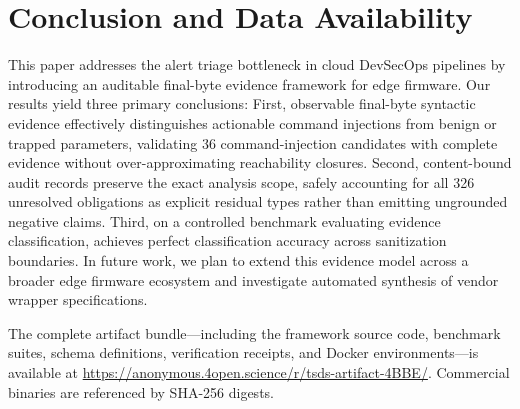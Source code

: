 \section{Conclusion and Data Availability}
\label{sec:conclusion}

This paper addresses the alert triage bottleneck in cloud DevSecOps pipelines by introducing an auditable final-byte evidence framework for edge firmware. Our results yield three primary conclusions:
First, observable final-byte syntactic evidence effectively distinguishes actionable command injections from benign or trapped parameters, validating 36 command-injection candidates with complete evidence without over-approximating reachability closures.
Second, content-bound audit records preserve the exact analysis scope, safely accounting for all 326 unresolved obligations as explicit residual types rather than emitting ungrounded negative claims.
Third, on a controlled benchmark evaluating evidence classification, \tool achieves perfect classification accuracy across sanitization boundaries. In future work, we plan to extend this evidence model across a broader edge firmware ecosystem and investigate automated synthesis of vendor wrapper specifications.

The complete artifact bundle---including the framework source code, benchmark suites, schema definitions, verification receipts, and Docker environments---is available at \url{https://anonymous.4open.science/r/tsds-artifact-4BBE/}. Commercial binaries are referenced by SHA-256 digests.

